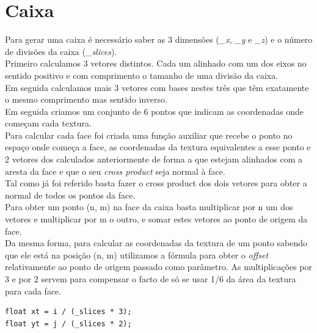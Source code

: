 \documentclass[a4paper]{report}
\begin{document}
\section{Caixa}
Para gerar uma caixa é necessário saber as 3 dimensões (\textit{\_x},
\textit{\_y} e \textit{\_z})  e o número de
divisões da caixa (\textit{\_slices}).\\
Primeiro calculamos 3 vetores distintos. Cada um alinhado com um dos eixos no
sentido positivo e com comprimento o tamanho de uma divisão da caixa.\\
Em seguida calculamos mais 3 vetores com bases nestes três que têm exatamente o
mesmo comprimento mas sentido inverso.\\
Em seguida criamos um conjunto de 6 pontos que indicam as coordenadas onde
começam cada textura.\\
Para calcular cada face foi criada uma função auxiliar que recebe o ponto no
espaço onde começa a face, as coordenadas da textura equivalentes a esse ponto e
2 vetores dos calculados anteriormente de forma a que estejam alinhados com a
aresta da face e que o seu \textit{cross product} seja normal à face.\\
Tal como já foi referido basta fazer o cross product dos dois vetores para obter
a normal de todos os pontos da face.\\
Para obter um ponto (n, m) na face da caixa basta multiplicar por n um dos
vetores e multiplicar por m o outro, e somar estes vetores ao ponto de origem da
face.\\
Da mesma forma, para calcular as coordenadas da textura de um ponto sabendo que
ele está na posição (n, m) utilizamos a fórmula para obter o \textit{offset}
relativamente ao ponto de origem passado como parâmetro. As multiplicações por 3 e
por 2 servem para compensar o facto de só se usar 1/6 da área da textura para
cada face.
\begin{lstlisting}
float xt = i / (_slices * 3);
float yt = j / (_slices * 2);
\end{lstlisting}
\end{document}
